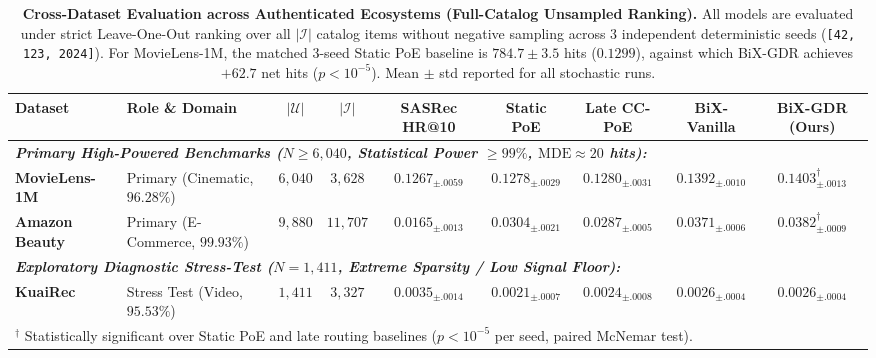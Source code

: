 \begin{table}[t]
\centering
\small
\caption{\textbf{Cross-Dataset Evaluation across Authenticated Ecosystems (Full-Catalog Unsampled Ranking).} All models are evaluated under strict Leave-One-Out ranking over all $|\mathcal{I}|$ catalog items without negative sampling across 3 independent deterministic seeds (\texttt{[42, 123, 2024]}). For MovieLens-1M, the matched 3-seed Static PoE baseline is $784.7 \pm 3.5$ hits ($0.1299$), against which BiX-GDR achieves $+62.7$ net hits ($p < 10^{-5}$). Mean $\pm$ std reported for all stochastic runs.}
\label{tab:cross_dataset_comprehensive}
\begin{tabular}{llccccccc}
\toprule
\textbf{Dataset} & \textbf{Role \& Domain} & $|\mathcal{U}|$ & $|\mathcal{I}|$ & \textbf{SASRec HR@10} & \textbf{Static PoE} & \textbf{Late CC-PoE} & \textbf{BiX-Vanilla} & \textbf{BiX-GDR (Ours)} \\
\midrule
\multicolumn{9}{l}{\textit{\textbf{Primary High-Powered Benchmarks ($N \ge 6{,}040$, Statistical Power $\ge 99\%$, $\text{MDE} \approx 20$ hits):}}} \\
\textbf{MovieLens-1M} & Primary (Cinematic, $96.28\%$) & $6{,}040$ & $3{,}628$ & $0.1267_{\pm .0059}$ & $0.1278_{\pm .0029}$ & $0.1280_{\pm .0031}$ & $0.1392_{\pm .0010}$ & $\mathbf{0.1403}_{\pm .0013}^\dagger$ \\
\textbf{Amazon Beauty} & Primary (E-Commerce, $99.93\%$) & $9{,}880$ & $11{,}707$ & $0.0165_{\pm .0013}$ & $0.0304_{\pm .0021}$ & $0.0287_{\pm .0005}$ & $0.0371_{\pm .0006}$ & $\mathbf{0.0382}_{\pm .0009}^\dagger$ \\
\midrule
\multicolumn{9}{l}{\textit{\textbf{Exploratory Diagnostic Stress-Test ($N = 1{,}411$, Extreme Sparsity / Low Signal Floor):}}} \\
\textbf{KuaiRec} & Stress Test (Video, $95.53\%$) & $1{,}411$ & $3{,}327$ & $0.0035_{\pm .0014}$ & $0.0021_{\pm .0007}$ & $0.0024_{\pm .0008}$ & $0.0026_{\pm .0004}$ & $\mathbf{0.0026}_{\pm .0004}$ \\
\bottomrule
\multicolumn{9}{l}{\footnotesize $^\dagger$ Statistically significant over Static PoE and late routing baselines ($p < 10^{-5}$ per seed, paired McNemar test).}
\end{tabular}
\end{table}

